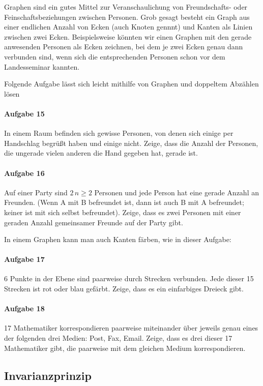 \documentclass[11pt,a4paper]{article}
\begin{document}
Graphen sind ein gutes Mittel zur Veranschaulichung von Freundschafts- oder
Feinschaftsbeziehungen zwischen Personen. Grob gesagt besteht ein Graph aus
einer endlichen Anzahl von Ecken (auch Knoten gennnt) und Kanten als Linien
zwischen zwei Ecken. Beispielsweise könnten wir einen Graphen mit den gerade
anwesenden Personen als Ecken zeichnen, bei dem je zwei Ecken genau dann
verbunden sind, wenn sich die entsprechenden Personen schon vor dem
Landesseminar kannten.

Folgende Aufgabe lässt sich leicht mithilfe von Graphen und doppeltem Abzählen
lösen

\paragraph{Aufgabe 15} 
In einem Raum befinden sich gewisse Personen, von denen sich einige per
Handschlag begrüßt haben und einige nicht. Zeige, dass die Anzahl der
Personen, die ungerade vielen anderen die Hand gegeben hat, gerade ist.

\paragraph{Aufgabe 16} 
Auf einer Party sind $2\,n\geq 2$ Personen und jede Person hat eine gerade
Anzahl an Freunden. (Wenn A mit B befreundet ist, dann ist auch B mit A
befreundet; keiner ist mit sich selbst befreundet). Zeige, dass es zwei
Personen mit einer geraden Anzahl gemeinsamer Freunde auf der Party gibt.

In einem Graphen kann man auch Kanten färben, wie in dieser Aufgabe:

\paragraph{Aufgabe 17} 
6 Punkte in der Ebene sind paarweise durch Strecken verbunden. Jede dieser 15
Strecken ist rot oder blau gefärbt. Zeige, dass es ein einfarbiges Dreieck
gibt.

\paragraph{Aufgabe 18} 
17 Mathematiker korrespondieren paarweise miteinander über jeweils genau eines
der folgenden drei Medien: Post, Fax, Email. Zeige, dass es drei dieser 17
Mathematiker gibt, die paarweise mit dem gleichen Medium korrespondieren.

\subsection*{Invarianzprinzip}
\end{document}
